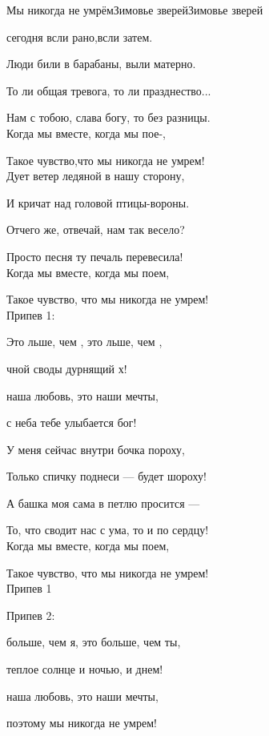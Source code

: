 \documentclass[11pt,a5paper]{book}
\renewcommand{\tt}{\indent \indent}
\begin{document}
\begin{song}{Мы никогда не умрём}{}{Зимовье зверей}{Зимовье зверей}{}{}

 сегодня всли рано,всли затем.\par
Люди били в барабаны, выли матерно.\par
То ли общая тревога, то ли празднество...\par
Нам с тобою, слава богу, то без разницы.\\

Когда мы вместе, когда мы пое-,\par
Такое чувство,что мы никогда не умрем!\\

Дует ветер ледяной в нашу сторону,\par
И кричат над головой птицы-вороны.\par
Отчего же, отвечай, нам так весело?\par
Просто песня ту печаль перевесила!\\

Когда мы вместе, когда мы поем,\par
Такое чувство, что мы никогда не умрем!\\

Припев 1:\par
\tt{}Это льше, чем , это льше, чем ,\par
{} чной своды дурнящий х!\par
{} наша любовь, это наши мечты,\par
{} с неба тебе улыбается бог!\\

\newpage

У меня сейчас внутри бочка пороху,\par
Только спичку поднеси — будет шороху!\par
А башка моя сама в петлю просится —\par
То, что сводит нас с ума, то и по сердцу!\\

Когда мы вместе, когда мы поем,\par
Такое чувство, что мы никогда не умрем!\\

Припев 1\par
Припев 2:\par
{} больше, чем я, это больше, чем ты,\par
{} теплое солнце и ночью, и днем!\par
{} наша любовь, это наши мечты,\par
{} поэтому мы никогда не умрем!\\


\end{song}
\end{document}
